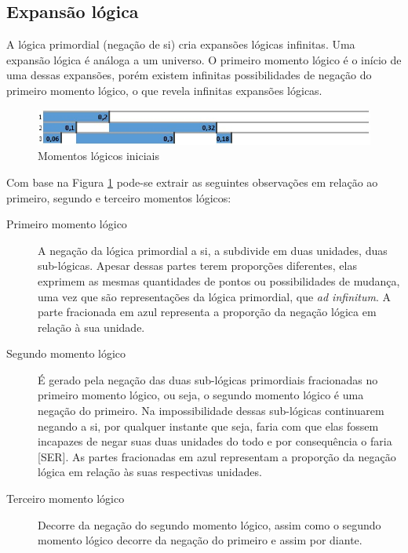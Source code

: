 \subsection{Expansão lógica}
A lógica primordial (negação de si) cria expansões lógicas infinitas. Uma expansão lógica é análoga a um universo. O primeiro momento lógico é o início de uma dessas expansões, porém existem infinitas possibilidades de negação do primeiro momento lógico, o que revela infinitas expansões lógicas.
	\begin{figure}[H]
	\caption{Momentos lógicos iniciais}
	\label{fig:third_logical_moment}
	\centering
	\includegraphics[scale=.75]{sections/images/third_logical_moment.jpg}
	\end{figure}

Com base na Figura \ref{fig:third_logical_moment} pode-se extrair as seguintes observações em relação ao primeiro, segundo e terceiro momentos lógicos:
	\begin{description}
	   \item[Primeiro momento lógico] A negação da lógica primordial a si, a subdivide em duas unidades, duas sub-lógicas. Apesar dessas partes terem proporções diferentes, elas exprimem as mesmas quantidades de pontos ou possibilidades de mudança, uma vez que são representações da lógica primordial, que \textit{ad infinitum}. A parte fracionada em azul representa a proporção da negação lógica em relação à sua unidade.
	   \item[Segundo momento lógico] É gerado pela negação das duas sub-lógicas primordiais fracionadas no primeiro momento lógico, ou seja, o segundo momento lógico é uma negação do primeiro. Na impossibilidade dessas sub-lógicas continuarem negando a si, por qualquer instante que seja, faria com que elas fossem incapazes de negar suas duas unidades do todo e por consequência o faria [SER]. As partes fracionadas em azul representam a proporção da negação lógica em relação às suas respectivas unidades.
	   \item[Terceiro momento lógico] Decorre da negação do segundo momento lógico, assim como o segundo momento lógico decorre da negação do primeiro e assim por diante.
	\end{description}

